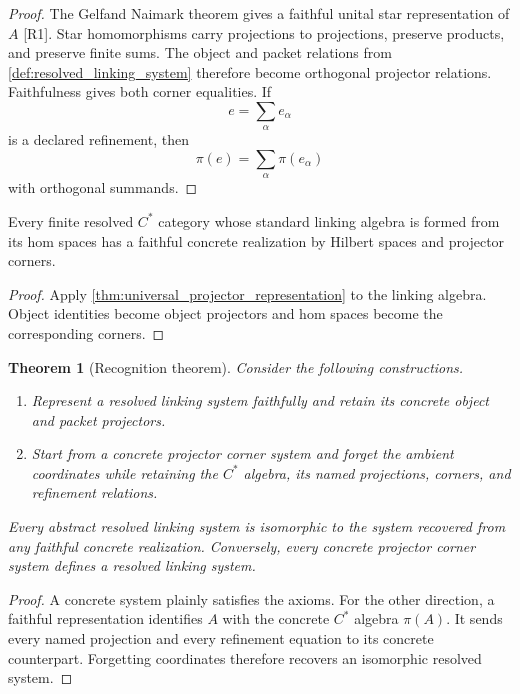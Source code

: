 \documentclass{aomart}
\newtheorem{theorem}{Theorem}[section]
\theoremstyle{definition}
\theoremstyle{remark}
\newcommand{\Rcite}[1]{\textup{[#1]}}
\begin{document}
\begin{proof}
The Gelfand Naimark theorem gives a faithful unital star representation of \(A\) \Rcite{R1}. Star homomorphisms carry projections to projections, preserve products, and preserve finite sums. The object and packet relations from \cref{def:resolved_linking_system} therefore become orthogonal projector relations. Faithfulness gives both corner equalities. If
\[
 e=\sum_\alpha e_\alpha
\]
is a declared refinement, then
\[
 \pi(e)=\sum_\alpha\pi(e_\alpha)
\]
with orthogonal summands.
\end{proof}

\begin{corollary}\label{cor:resolved_categories}
Every finite resolved \(C^*\) category whose standard linking algebra is formed from its hom spaces has a faithful concrete realization by Hilbert spaces and projector corners.
\end{corollary}

\begin{proof}
Apply \cref{thm:universal_projector_representation} to the linking algebra. Object identities become object projectors and hom spaces become the corresponding corners.
\end{proof}

\begin{theorem}[Recognition theorem]\label{thm:recognition}
Consider the following constructions.
\begin{enumerate}
\item Represent a resolved linking system faithfully and retain its concrete object and packet projectors.
\item Start from a concrete projector corner system and forget the ambient coordinates while retaining the \(C^*\) algebra, its named projections, corners, and refinement relations.
\end{enumerate}
Every abstract resolved linking system is isomorphic to the system recovered from any faithful concrete realization. Conversely, every concrete projector corner system defines a resolved linking system.
\end{theorem}

\begin{proof}
A concrete system plainly satisfies the axioms. For the other direction, a faithful representation identifies \(A\) with the concrete \(C^*\) algebra \(\pi(A)\). It sends every named projection and every refinement equation to its concrete counterpart. Forgetting coordinates therefore recovers an isomorphic resolved system.
\end{proof}
\end{document}
